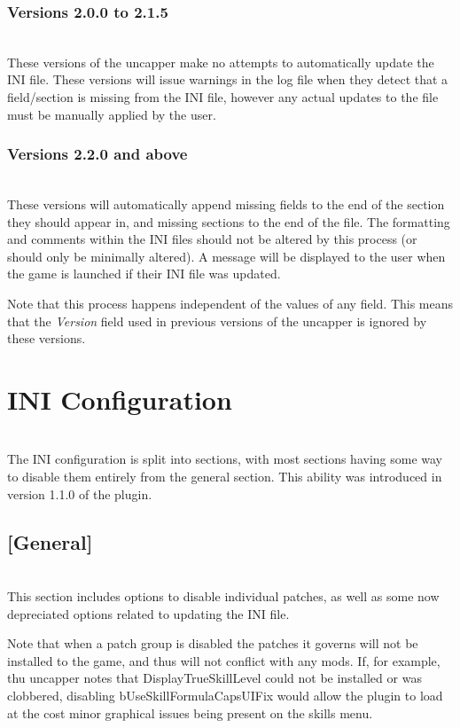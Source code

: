 \documentclass[12pt]{amsart}
\begin{document}
\startblock
\subsubsection{Versions 2.0.0 to 2.1.5}\hfill\\

These versions of the uncapper make no attempts to automatically update the INI
file. These versions will issue warnings in the log file when they detect
that a field/section is missing from the INI file, however any actual updates
to the file must be manually applied by the user.
\stopblock

\startblock
\subsubsection{Versions 2.2.0 and above}\hfill\\

These versions will automatically append missing fields to the end of the
section they should appear in, and missing sections to the end of the file.
The formatting and comments within the INI files should not be altered by this
process (or should only be minimally altered). A message will be displayed to
the user when the game is launched if their INI file was updated.

Note that this process happens independent of the values of any field. This
means that the \textit{Version} field used in previous versions of the uncapper
is ignored by these versions.
\stopblock

\startblock
\section{INI Configuration}\hfill\\

The INI configuration is split into sections, with most sections having some
way to disable them entirely from the general section. This ability was
introduced in version 1.1.0 of the plugin.
\stopblock

\startblock
\subsection{[General]}\hfill\\

This section includes options to disable individual patches, as well as some
now depreciated options related to updating the INI file.

Note that when a patch group is disabled the patches it governs will not be
installed to the game, and thus will not conflict with any mods. If, for
example, thu uncapper notes that DisplayTrueSkillLevel could not be installed
or was clobbered, disabling bUseSkillFormulaCapsUIFix would allow the plugin
to load at the cost minor graphical issues being present on the skills menu.
\stopblock
\end{document}
